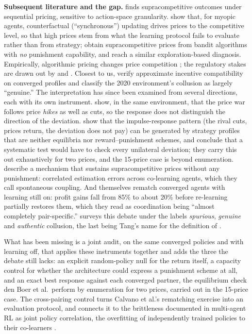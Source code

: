 \documentclass[sigconf]{acmart}
\begin{document}
\textbf{Subsequent literature and the gap.} \citet{klein2021} finds
supracompetitive outcomes under sequential pricing, sensitive to
action-space granularity. \citet{asker2024} show that, for myopic
agents, counterfactual (``synchronous'') updating drives prices to the
competitive level, so that high prices stem from what the learning
protocol fails to evaluate rather than from strategy; \citet{hansen2021}
obtain supracompetitive prices from bandit algorithms with \emph{no}
punishment capability, and \citet{abada2023} reach a similar
exploration-based diagnosis. Empirically, algorithmic pricing changes
price competition \citep{brown2023, assad2024}; the regulatory stakes
are drawn out by \citet{harrington2018} and \citet{oecd2017}. Closest to
us, \citet[hereafter Calvano IJIO]{calvano2023} verify approximate
incentive compatibility on converged profiles and classify the 2020
environment's collusion as largely ``genuine.'' The interpretation has
since been examined from several directions, each with its own
instrument. \citet{epivent2024} show, in the same environment, that the
price war follows price \emph{hikes} as well as cuts, so the response
does not distinguish the direction of the deviation. \citet{denboer2022}
show that the impulse-response pattern (the rival cuts, prices return,
the deviation does not pay) can be generated by strategy profiles that
are neither equilibria nor reward--punishment schemes, and conclude that
a systematic test would have to check every unilateral deviation; they
carry this out exhaustively for two prices, and the 15-price case is
beyond enumeration. \citet{banchio2022} describe a mechanism that
sustains supracompetitive prices without any punishment: correlated
estimation errors across co-learning agents, which they call spontaneous
coupling. And \citet[Section VI.B]{calvano2020} themselves rematch
converged agents with learning still on: profit gains fall from 85\% to
about 20\% before re-learning partially restores them, which they read
as coordination being ``almost completely pair-specific.''
\citet{tang2024} surveys this debate under the labels \emph{spurious},
\emph{genuine} and \emph{authentic} collusion, the last being Tang's
name for the definition of \citet{denboer2023}.

What has been missing is a joint audit, on the same converged policies
and with learning off, that applies these instruments together and adds
the three the debate still lacks: an explicit random-policy null for the
return itself, a capacity control for whether the architecture could
express a punishment scheme at all, and an exact best response against
each converged partner, the equilibrium check den Boer et al.~perform by
enumeration for two prices, carried out in the 15-price case. The
cross-pairing control turns Calvano et al.'s rematching exercise into an
evaluation protocol, and connects it to the brittleness documented in
multi-agent RL as joint policy correlation, the overfitting of
independently trained policies to their co-learners \citep{lanctot2017}.
\end{document}
